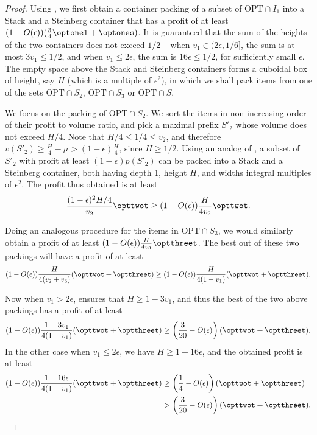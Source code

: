 \begin{proof}
    Using , we first obtain a container packing of a subset of $\text{OPT}\cap I_1$ into a Stack and a Steinberg container that has a profit of at least $(1-O(\epsilon))(\frac{3}{4}\optonel+\optones)$. It is guaranteed that the sum of the heights of the two containers does not exceed $1/2$ -- when $v_1 \in (2\epsilon, 1/6]$, the sum is at most $3v_1 \le 1/2$, and when $v_1 \le 2\epsilon$, the sum is $16\epsilon \le 1/2$, for sufficiently small $\epsilon$. The empty space above the Stack and Steinberg containers forms a cuboidal box of height, say $H$ (which is a multiple of $\epsilon^2$), in which we shall pack items from one of the sets $\text{OPT}\cap S_2$, $\text{OPT}\cap S_3$ or $\text{OPT}\cap S$. 

    We focus on the packing of $\text{OPT}\cap S_2$. We sort the items in non-increasing order of their profit to volume ratio, and pick a maximal prefix $S'_2$ whose volume does not exceed $H/4$. Note that $H/4 \le 1/4\le v_2$, and therefore $v(S'_2) \ge \frac{H}{4}-\mu > (1-\epsilon)\frac{H}{4}$, since $H\ge 1/2$. Using an analog of , a subset of $S'_2$ with profit at least $(1-\epsilon)p(S'_2)$ can be packed into a Stack and a Steinberg container, both having depth 1, height $H$, and widths integral multiples of $\epsilon^2$. The profit thus obtained is at least
    \[ \frac{(1-\epsilon)^2 H/4}{v_2}\opttwot \ge (1-O(\epsilon))\frac{H}{4v_2}\opttwot.\]

    Doing an analogous procedure for the items in $\text{OPT}\cap S_3$, we would similarly obtain a profit of at least $(1-O(\epsilon))\frac{H}{4v_3}\optthreet$. The best out of these two packings will have a profit of at least
    \[(1-O(\epsilon))\frac{H}{4(v_2+v_3)}(\opttwot + \optthreet) \ge (1-O(\epsilon))\frac{H}{4(1-v_1)}(\opttwot + \optthreet).\]

    Now when $v_1 > 2\epsilon$,  ensures that $H\ge 1-3v_1$, and thus the best of the two above packings has a profit of at least
    \[ (1-O(\epsilon))\frac{1-3v_1}{4(1-v_1)}(\opttwot + \optthreet) \ge \left(\frac{3}{20}-O(\epsilon)\right)(\opttwot + \optthreet).\]
    In the other case when $v_1 \le 2\epsilon$, we have $H \ge 1-16\epsilon$, and the obtained profit is at least 
    \begin{align*}
        (1-O(\epsilon))\frac{1-16\epsilon}{4(1-v_1)}(\opttwot + \optthreet) &\ge \left(\frac{1}{4}-O(\epsilon)\right)(\opttwot + \optthreet)\\ 
        &> \left(\frac{3}{20}-O(\epsilon)\right)(\opttwot + \optthreet).
    \end{align*}


\end{proof}
